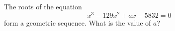 The roots of the equation
\[x^3-129x^2+ax-5832=0\]
form a geometric sequence. What is the value of $a$?
